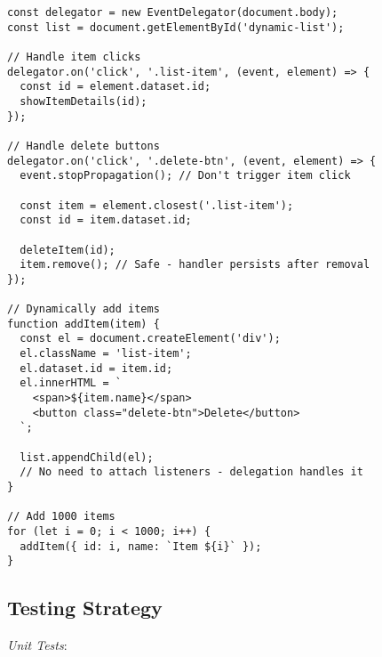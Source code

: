\documentclass[11pt]{article}
\begin{document}
\begin{verbatim}
const delegator = new EventDelegator(document.body);
const list = document.getElementById('dynamic-list');

// Handle item clicks
delegator.on('click', '.list-item', (event, element) => {
  const id = element.dataset.id;
  showItemDetails(id);
});

// Handle delete buttons
delegator.on('click', '.delete-btn', (event, element) => {
  event.stopPropagation(); // Don't trigger item click
  
  const item = element.closest('.list-item');
  const id = item.dataset.id;
  
  deleteItem(id);
  item.remove(); // Safe - handler persists after removal
});

// Dynamically add items
function addItem(item) {
  const el = document.createElement('div');
  el.className = 'list-item';
  el.dataset.id = item.id;
  el.innerHTML = `
    <span>${item.name}</span>
    <button class="delete-btn">Delete</button>
  `;
  
  list.appendChild(el);
  // No need to attach listeners - delegation handles it
}

// Add 1000 items
for (let i = 0; i < 1000; i++) {
  addItem({ id: i, name: `Item ${i}` });
}
\end{verbatim}
\subsection{Testing Strategy}
\label{sec:orgdc3c2d8}

\emph{Unit Tests}:
\end{document}
